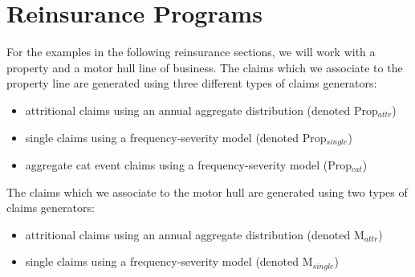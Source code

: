 \section{Reinsurance Programs}
\label{sec:RIPrograms}




For the examples in the following reinsurance sections, we will work with a property and a motor hull line of business. The claims which we associate to the property line are generated using three different types of claims generators:
\begin{itemize}
	\item attritional claims using an annual aggregate distribution (denoted Prop$_{attr}$)
	\item single claims using a frequency-severity model (denoted Prop$_{single}$)
	\item aggregate cat event claims using a frequency-severity model (Prop$_{cat}$)
\end{itemize}
The claims which we associate to the motor hull are generated using two types of claims generators:
\begin{itemize}
	\item attritional claims using an annual aggregate distribution (denoted M$_{attr}$)
	\item single claims using a frequency-severity model (denoted M$_{single}$)
\end{itemize}

